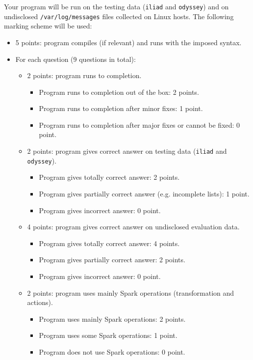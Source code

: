 \documentclass[11pt]{article}
\newcounter{ques}
\begin{document}
Your program will be run on the testing data (\texttt{iliad} and
\texttt{odyssey}) and on undisclosed
\texttt{/var/log/messages} files collected on Linux hosts. The following
marking scheme will be used:
\begin{itemize}
\item 5 points: program compiles (if relevant) and runs with the imposed syntax. 
\item For each question (9 questions in total):
  \begin{itemize}
  \item 2 points: program runs to completion.
    \begin{itemize}
    \item Program runs to completion out of the box: 2 points.
    \item Program runs to completion after minor fixes: 1 point.
    \item Program runs to completion after major fixes or cannot be fixed: 0 point.
    \end{itemize}
  \item 2 points: program gives correct answer on testing data (\texttt{iliad} and \texttt{odyssey}).
    \begin{itemize}
    \item Program gives totally correct answer: 2 points.
    \item Program gives partially correct answer (e.g. incomplete lists): 1 point.
    \item Program gives incorrect answer: 0 point.
    \end{itemize}
  \item 4 points: program gives correct answer on undisclosed evaluation data.
    \begin{itemize}
    \item Program gives totally correct answer: 4 points.
    \item Program gives partially correct answer: 2 points.
    \item Program gives incorrect answer: 0 point.
    \end{itemize}
  \item 2 points: program uses mainly Spark operations (transformation and actions).
    \begin{itemize}
    \item Program uses mainly Spark operations: 2 points.
    \item Program uses some Spark operations: 1 point. 
    \item Program does not use Spark operations: 0 point.

\end{itemize}
\end{itemize}
\end{itemize}
\end{document}
